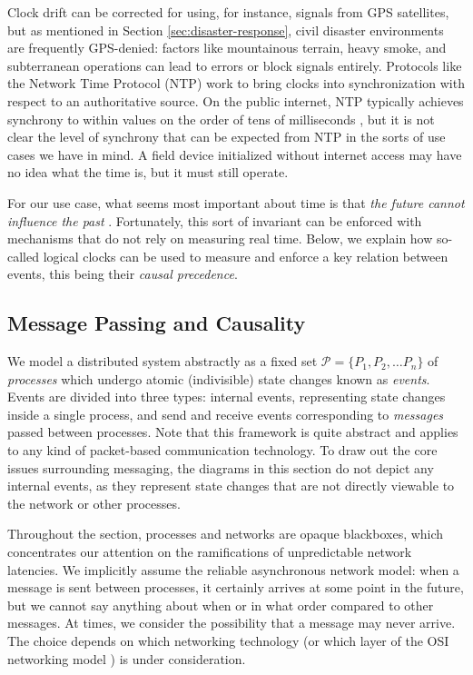 \documentclass[]             %
{NASA}                       %
\theoremstyle{definition}
\begin{document}
Clock drift can be corrected for using, for instance, signals from GPS
satellites, but as mentioned in Section \ref{sec:disaster-response},
civil disaster environments are frequently GPS-denied: factors like
mountainous terrain, heavy smoke, and subterranean operations can lead
to errors or block signals entirely. Protocols like the Network Time
Protocol (NTP) \cite{rfc1119} work to bring clocks into
synchronization with respect to an authoritative source. On the public
internet, NTP typically achieves synchrony to within values on the
order of tens of milliseconds \cite{rfc1128}, but it is not clear the
level of synchrony that can be expected from NTP in the sorts of use
cases we have in mind. A field device initialized without internet
access may have no idea what the time is, but it must still operate.

For our use case, what seems most important about time is that
\emph{the future cannot influence the past}
\cite{1989mattern}. Fortunately, this sort of invariant can be
enforced with mechanisms that do not rely on measuring real
time. Below, we explain how so-called logical clocks can be used to
measure and enforce a key relation between events, this being their
\emph{causal precedence}.


\subsection{Message Passing and Causality}
\label{ssec:message-passing}
We model a distributed system abstractly as a fixed set
$\mathcal{P} = \{P_1, P_2, \ldots P_n\}$ of \emph{processes} which
undergo atomic (indivisible) state changes known as
\emph{events}. Events are divided into three types: internal events,
representing state changes inside a single process, and send and
receive events corresponding to \emph{messages} passed between
processes. Note that this framework is quite abstract and applies to
any kind of packet-based communication technology. To draw out the
core issues surrounding messaging, the diagrams in this section do not
depict any internal events, as they represent state changes that are
not directly viewable to the network or other processes.

Throughout the section, processes and networks are opaque blackboxes,
which concentrates our attention on the ramifications of unpredictable
network latencies. We implicitly assume the reliable asynchronous
network model: when a message is sent between processes, it certainly
arrives at some point in the future, but we cannot say anything about
when or in what order compared to other messages. At times, we
consider the possibility that a message may never arrive. The choice
depends on which networking technology (or which layer of the OSI
networking model \cite{1983:osi-reference-model}) is under
consideration.
\end{document}
